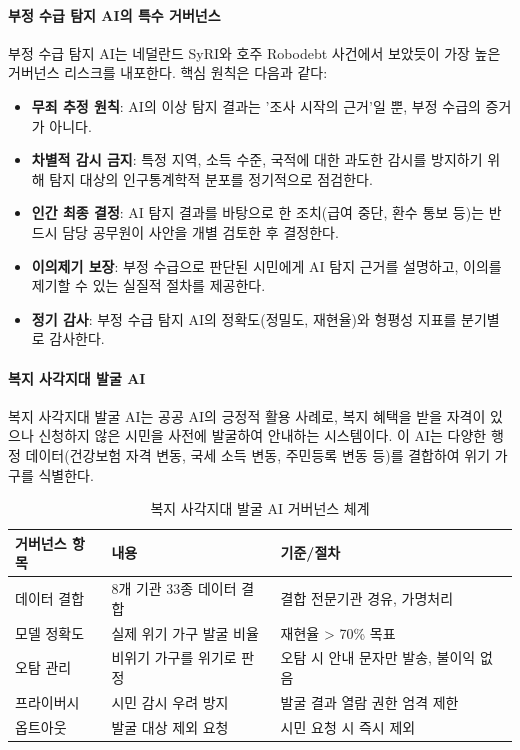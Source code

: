 \paragraph{부정 수급 탐지 AI의 특수 거버넌스}

부정 수급 탐지 AI는 네덜란드 SyRI와 호주 Robodebt 사건에서 보았듯이 가장 높은 거버넌스 리스크를 내포한다. 핵심 원칙은 다음과 같다:

\begin{itemize}
    \item \textbf{무죄 추정 원칙}: AI의 이상 탐지 결과는 '조사 시작의 근거'일 뿐, 부정 수급의 증거가 아니다.
    \item \textbf{차별적 감시 금지}: 특정 지역, 소득 수준, 국적에 대한 과도한 감시를 방지하기 위해 탐지 대상의 인구통계학적 분포를 정기적으로 점검한다.
    \item \textbf{인간 최종 결정}: AI 탐지 결과를 바탕으로 한 조치(급여 중단, 환수 통보 등)는 반드시 담당 공무원이 사안을 개별 검토한 후 결정한다.
    \item \textbf{이의제기 보장}: 부정 수급으로 판단된 시민에게 AI 탐지 근거를 설명하고, 이의를 제기할 수 있는 실질적 절차를 제공한다.
    \item \textbf{정기 감사}: 부정 수급 탐지 AI의 정확도(정밀도, 재현율)와 형평성 지표를 분기별로 감사한다.
\end{itemize}

\paragraph{복지 사각지대 발굴 AI}

복지 사각지대 발굴 AI는 공공 AI의 긍정적 활용 사례로, 복지 혜택을 받을 자격이 있으나 신청하지 않은 시민을 사전에 발굴하여 안내하는 시스템이다. 이 AI는 다양한 행정 데이터(건강보험 자격 변동, 국세 소득 변동, 주민등록 변동 등)를 결합하여 위기 가구를 식별한다.

\begin{table}[htbp]
\centering
\caption{복지 사각지대 발굴 AI 거버넌스 체계}
\label{tab:18_welfare_gap}
\begin{tabularx}{\textwidth}{p{2.5cm}Xp{4cm}}
\toprule
\textbf{거버넌스 항목} & \textbf{내용} & \textbf{기준/절차} \\
\midrule
데이터 결합 & 8개 기관 33종 데이터 결합 & 결합 전문기관 경유, 가명처리 \\
모델 정확도 & 실제 위기 가구 발굴 비율 & 재현율 > 70\% 목표 \\
오탐 관리 & 비위기 가구를 위기로 판정 & 오탐 시 안내 문자만 발송, 불이익 없음 \\
프라이버시 & 시민 감시 우려 방지 & 발굴 결과 열람 권한 엄격 제한 \\
옵트아웃 & 발굴 대상 제외 요청 & 시민 요청 시 즉시 제외 \\
\bottomrule
\end{tabularx}
\end{table}

